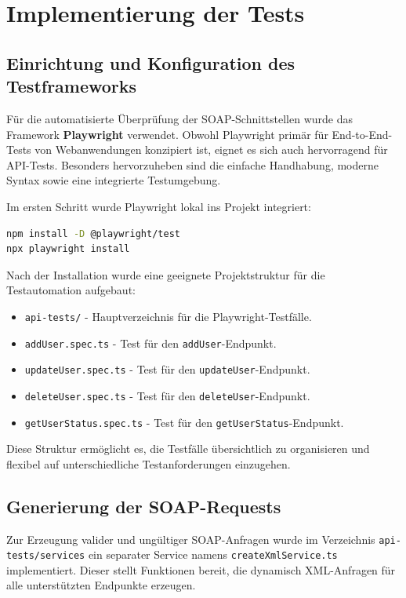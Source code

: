 \section{Implementierung der Tests}

\subsection{Einrichtung und Konfiguration des Testframeworks}

Für die automatisierte Überprüfung der SOAP-Schnittstellen wurde das Framework \textbf{Playwright} verwendet. Obwohl Playwright primär für End-to-End-Tests von Webanwendungen konzipiert ist, eignet es sich auch hervorragend für API-Tests. Besonders hervorzuheben sind die einfache Handhabung, moderne Syntax sowie eine integrierte Testumgebung.

Im ersten Schritt wurde Playwright lokal ins Projekt integriert:

\begin{lstlisting}[language=bash, caption={Installation von Playwright}]
npm install -D @playwright/test
npx playwright install
\end{lstlisting}

Nach der Installation wurde eine geeignete Projektstruktur für die Testautomation aufgebaut:

\begin{itemize}
  \item \texttt{api-tests/} - Hauptverzeichnis für die Playwright-Testfälle.
  \item \texttt{addUser.spec.ts} - Test für den \texttt{addUser}-Endpunkt.
  \item \texttt{updateUser.spec.ts} - Test für den \texttt{updateUser}-Endpunkt.
  \item \texttt{deleteUser.spec.ts} - Test für den \texttt{deleteUser}-Endpunkt.
  \item \texttt{getUserStatus.spec.ts} - Test für den \texttt{getUserStatus}-Endpunkt.
\end{itemize}

Diese Struktur ermöglicht es, die Testfälle übersichtlich zu organisieren und flexibel auf unterschiedliche Testanforderungen einzugehen.

\subsection{Generierung der SOAP-Requests}

Zur Erzeugung valider und ungültiger SOAP-Anfragen wurde im Verzeichnis \texttt{api-tests/services} ein separater Service namens \texttt{createXmlService.ts} implementiert. Dieser stellt Funktionen bereit, die dynamisch XML-Anfragen für alle unterstützten Endpunkte erzeugen.

